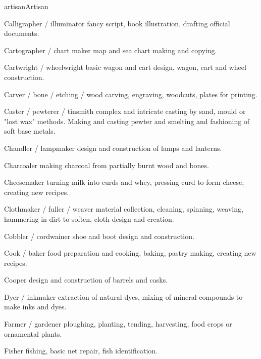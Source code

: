 \begin{Skill}[2.0]{artisan}{Artisan}
\begin{Description}
\item[Calligrapher / illuminator] fancy script, book illustration,
  drafting official documents.

\item[Cartographer / chart] maker map and sea chart making and
  copying.

\item[Cartwright / wheelwright] basic wagon and cart design, wagon,
  cart and wheel construction.

\item[Carver / bone / etching / wood] carving, engraving, woodcuts,
  plates for printing.

\item[Caster / pewterer / tinsmith] complex and intricate casting by
  sand, mould or "lost wax" methods.  Making and casting pewter and
  smelting and fashioning of soft base metals.

\item[Chandler / lampmaker] design and construction of 
lamps and lanterns. 

\item[Charcoaler] making charcoal from partially burnt wood and bones.

\item[Cheesemaker] turning milk into curds and whey, pressing curd to
  form cheese, creating new recipes.

\item[Clothmaker / fuller / weaver] material collection, cleaning,
  spinning, weaving, hammering in dirt to soften, cloth design and
  creation.

\item[Cobbler / cordwainer] shoe and boot design and construction.

\item[Cook / baker] food preparation and cooking, baking, pastry
  making, creating new recipes.

\item[Cooper] design and construction of barrels and casks.

\item[Dyer / inkmaker] extraction of natural dyes, mixing of mineral
  compounds to make inks and dyes.

\item[Farmer / gardener] ploughing, planting, tending, harvesting,
  food crops or ornamental plants.

\item[Fisher] fishing, basic net repair, fish identification. 


\end{Description}
\end{Skill}
